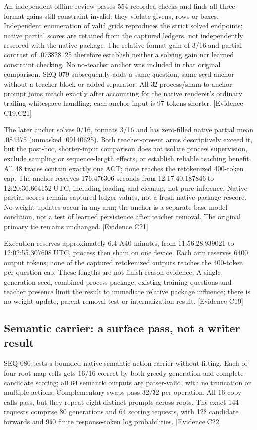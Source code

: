 \documentclass[11pt]{article}
\newcommand{\ev}[1]{\textsf{[Evidence #1]}}
\begin{document}
An independent offline review passes 554 recorded checks and finds all three
format gains still constraint-invalid: they violate givens, rows or boxes.
Independent enumeration of valid grids reproduces the strict solved endpoints;
native partial scores are retained from the captured ledgers, not independently
rescored with the native package. The relative format gain of 3/16 and partial
contrast of .073828125 therefore establish neither a solving gain nor learned
constraint checking. No no-teacher anchor was included in that original
comparison. SEQ-079 subsequently adds a same-question, same-seed anchor without
a teacher block or added separator. All 32 process/sham-to-anchor prompt joins
match exactly after accounting for the native renderer's ordinary trailing
whitespace handling; each anchor input is 97 tokens shorter. \ev{C19,C21}

The later anchor solves 0/16, formats 3/16 and has zero-filled native partial
mean .084375 (unmasked .09140625). Both teacher-present arms descriptively exceed
it, but the post-hoc, shorter-input comparison does not isolate process supervision,
exclude sampling or sequence-length effects, or establish reliable teaching
benefit. All 48 traces contain exactly one ACT; none reaches the retokenized
400-token cap. The anchor reserves 176.476306 seconds from 12:17:40.187846 to
12:20:36.664152 UTC, including loading and cleanup, not pure inference. Native
partial scores remain captured ledger values, not a fresh native-package rescore.
No weight updates occur in any arm; the anchor is a separate base-model
condition, not a test of learned persistence after teacher removal. The original
primary tie remains unchanged. \ev{C21}

Execution reserves approximately 6.4 A40 minutes, from 11:56:28.939021 to
12:02:55.307608 UTC, process then sham on one device. Each arm reserves 6400
output tokens; none of the captured retokenized outputs reaches the 400-token
per-question cap. These lengths are not finish-reason evidence. A single
generation seed, combined process package, existing training questions and
teacher presence limit the result to immediate relative package influence;
there is no weight update, parent-removal test or internalization result. \ev{C19}

\subsection{Semantic carrier: a surface pass, not a writer result}
SEQ-080 tests a bounded native semantic-action carrier without fitting. Each
of four root-map cells gets 16/16 correct by both greedy generation and complete
candidate scoring; all 64 semantic outputs are parser-valid, with no truncation
or multiple actions. Complementary swaps pass 32/32 per operation. All 16 copy
calls pass, but they repeat eight distinct prompts across roots. The exact 144
requests comprise 80 generations and 64 scoring requests, with 128 candidate
forwards and 960 finite response-token log probabilities. \ev{C22}
\end{document}
